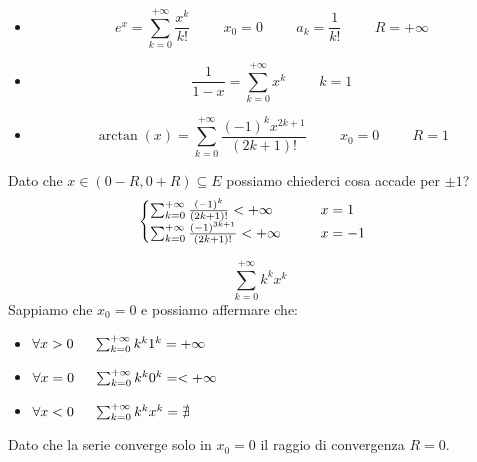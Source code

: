 \begin{example}
     \begin{itemize}
         \item \begin{equation*}e^x=\sum^{+\infty}_{k=0}\frac{x^k}{k!}\hspace{1cm}x_0=0\hspace{1cm}a_k=\frac{1}{k!}\hspace{1cm}R=+\infty\end{equation*}
         \item \begin{equation*}\frac{1}{1-x}=\sum^{+\infty}_{k=0}x^k\hspace{1cm}k=1\end{equation*}
         \item \begin{equation*}\arctan(x)=\sum^{+\infty}_{k=0}\frac{(-1)^kx^{2k+1}}{(2k+1)!}\hspace{1cm}x_0=0\hspace{1cm}R=1\end{equation*}
     \end{itemize}
     Dato che $x\in(0-R,0+R)\subseteq E$ possiamo chiederci cosa accade per $\pm1$?
     $$\begin{cases}
         \sum^{+\infty}_{k=0}\frac{(-1)^k}{(2k+1)!}<+\infty\hspace{1.2cm}x=1\\
         \sum^{+\infty}_{k=0}\frac{(-1)^{3k+1}}{(2k+1)!}<+\infty\hspace{1cm}x=-1
     \end{cases}$$
\end{example}

\begin{example}
     \begin{equation*}\sum^{+\infty}_{k=0}k^kx^k\end{equation*}
     Sappiamo che $x_0=0$ e possiamo affermare che:
     \begin{itemize}
         \item[] $\forall x>0\hspace{0.5cm}\sum^{+\infty}_{k=0}k^k1^k=+\infty$
         \item[] $\forall x=0\hspace{0.5cm}\sum^{+\infty}_{k=0}k^k0^k=<+\infty$
         \item[] $\forall x<0\hspace{0.5cm}\sum^{+\infty}_{k=0}k^kx^k=\nexists$
     \end{itemize}
     Dato che la serie converge solo in $x_0=0$ il raggio di convergenza $R=0$.
\end{example}

